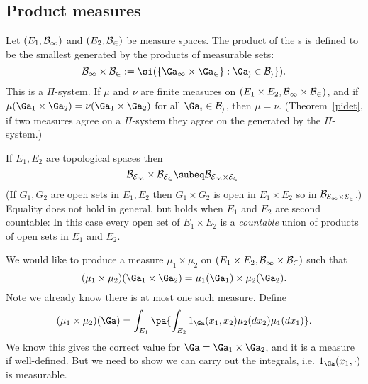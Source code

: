 
\subsection{Product measures}

Let $(E_1,\cal B_1)$ and $(E_2,\cal B_2)$ be measure spaces. The product of the \sia s is defined to be the smallest \sia{} generated by the products of measurable sets:
\[
\cal B_1\times \cal B_2:=\si(\{\Ga_1\times \Ga_2\}:\Ga_i\in \cal B_i\}).
\]
This is a $\Pi$-system. 
If $\mu$ and $\nu$ are finite measures on $(E_1\times E_2,\cal B_1\times \cal B_2)$, and if $\mu(\Ga_1\times \Ga_2)=\nu(\Ga_1\times \Ga_2)$ for all $\Ga_i\in \cal B_i$, then $\mu=\nu$. (Theorem~\ref{pidet}, if two measures agree on a $\Pi$-system they agree on the \sia{} generated by the $\Pi$-system.)

If $E_1,E_2$ are topological spaces then
\[
\cal B_{E_1}\times \cal B_{E_2}\subeq \cal B_{E_1\times E_2}.
\]
(If $G_1,G_2$ are open sets in $E_1,E_2$ then $G_1\times G_2$ is open in $E_1\times E_2$ so in $\cal B_{E_1\times E_2}$.) Equality does not hold in general, but holds when $E_1$ and $E_2$ are second countable: %
In this case every open set of $E_1\times E_2$ is a {\it countable} union of products of open sets in $E_1$ and $E_2$.

We would like to produce a measure $\mu_1\times \mu_2$ on $(E_1\times E_2,\cal B_1\times \cal B_2)$ such that 
\[
(\mu_1\times \mu_2)(\Ga_1\times \Ga_2)=\mu_1(\Ga_1)\times \mu_2(\Ga_2).
\]
Note we already know there is at most one such measure.
Define
\begin{equation}\label{pmeas}
(\mu_1\times \mu_2)(\Ga)=
\int_{E_1}\pa{
\int_{E_2}
1_{\Ga}(x_1,x_2)\mu_2(dx_2)
\mu_1(dx_1)}.
\end{equation}
We know this gives the correct value for $\Ga=\Ga_1\times \Ga_2$, and it is a measure if well-defined. But we need to show we can carry out the integrals, i.e. $1_{\Ga}(x_1,\cdot)$ is measurable.

